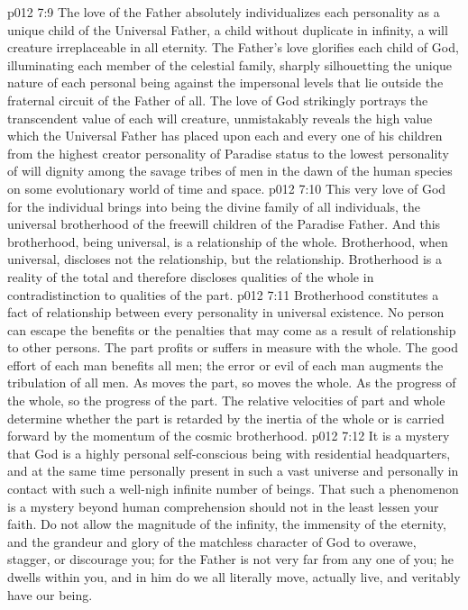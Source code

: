 \vs p012 7:9 The love of the Father absolutely individualizes each personality as a unique child of the Universal Father, a child without duplicate in infinity, a will creature irreplaceable in all eternity. The Father’s love glorifies each child of God, illuminating each member of the celestial family, sharply silhouetting the unique nature of each personal being against the impersonal levels that lie outside the fraternal circuit of the Father of all. The love of God strikingly portrays the transcendent value of each will creature, unmistakably reveals the high value which the Universal Father has placed upon each and every one of his children from the highest creator personality of Paradise status to the lowest personality of will dignity among the savage tribes of men in the dawn of the human species on some evolutionary world of time and space.
\vs p012 7:10 This very love of God for the individual brings into being the divine family of all individuals, the universal brotherhood of the freewill children of the Paradise Father. And this brotherhood, being universal, is a relationship of the whole. Brotherhood, when universal, discloses not the  relationship, but the  relationship. Brotherhood is a reality of the total and therefore discloses qualities of the whole in contradistinction to qualities of the part.
\vs p012 7:11 Brotherhood constitutes a fact of relationship between every personality in universal existence. No person can escape the benefits or the penalties that may come as a result of relationship to other persons. The part profits or suffers in measure with the whole. The good effort of each man benefits all men; the error or evil of each man augments the tribulation of all men. As moves the part, so moves the whole. As the progress of the whole, so the progress of the part. The relative velocities of part and whole determine whether the part is retarded by the inertia of the whole or is carried forward by the momentum of the cosmic brotherhood.
\vs p012 7:12 \pc It is a mystery that God is a highly personal self\hyp{}conscious being with residential headquarters, and at the same time personally present in such a vast universe and personally in contact with such a well\hyp{}nigh infinite number of beings. That such a phenomenon is a mystery beyond human comprehension should not in the least lessen your faith. Do not allow the magnitude of the infinity, the immensity of the eternity, and the grandeur and glory of the matchless character of God to overawe, stagger, or discourage you; for the Father is not very far from any one of you; he dwells within you, and in him do we all literally move, actually live, and veritably have our being.
